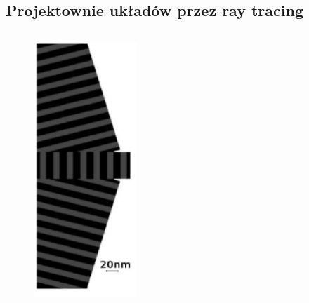 \documentclass{beamer}
\begin{document}
\subsection{Projektownie układów przez ray tracing}

\begin{frame}
	\begin{columns}
		\begin{column}{0.5\textwidth}
			\begin{figure}
				\includegraphics[angle=90,width=\textwidth]{../images/multilayer/konc_eps_mgr.png}\\

\end{figure}
\end{column}
\end{columns}
\end{frame}
\end{document}

